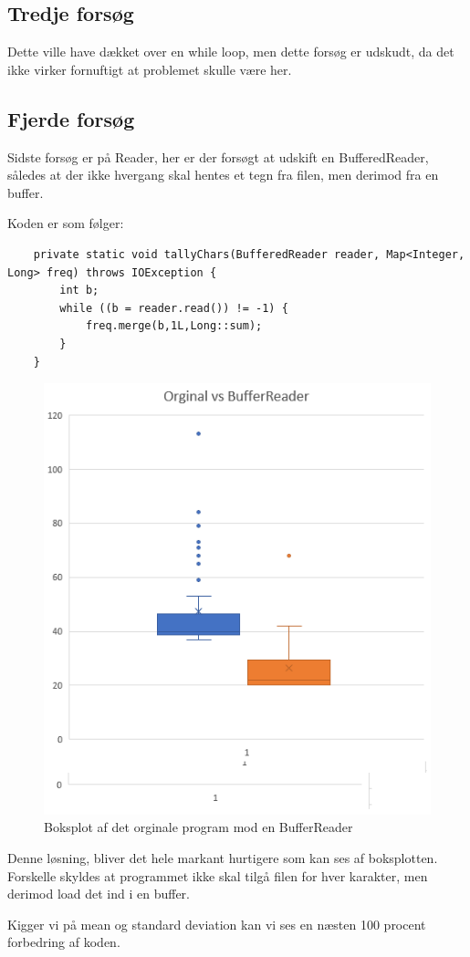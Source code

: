 \subsection*{Tredje forsøg}
Dette ville have dækket over en while loop, men dette forsøg er udskudt, da det ikke virker fornuftigt at problemet skulle være her.



\subsection{Fjerde forsøg}
Sidste forsøg er på Reader, her er der forsøgt at udskift en BufferedReader, således at der ikke hvergang skal hentes et tegn fra filen, men derimod fra en buffer.

Koden er som følger:
\begin{lstlisting}
    private static void tallyChars(BufferedReader reader, Map<Integer, Long> freq) throws IOException {
        int b;
        while ((b = reader.read()) != -1) {
            freq.merge(b,1L,Long::sum);
        }
    }
\end{lstlisting}

\newpage
\begin{figure}
  \includegraphics[width=0.4\linewidth]{orginalboksvsbuffer.png}
  \caption{Boksplot af det orginale program mod en BufferReader}
  \label{fig:orginalvsbuffer}
\end{figure}
Denne løsning, bliver det hele markant hurtigere som kan ses af boksplotten.
Forskelle skyldes at programmet ikke skal tilgå filen for hver karakter, men derimod load det ind i en buffer.
\newpage

Kigger vi på mean og standard deviation kan vi ses en næsten 100 procent forbedring af koden.

